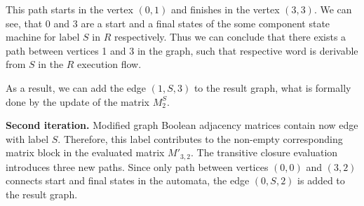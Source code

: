 This path starts in the vertex $(0,1)$ and finishes in the vertex $(3,3)$. 
We can see, that 0 and 3 are a start and a final states of the some component 
state machine for label $S$ in $R$ respectively. Thus we can conclude that 
there exists a path between vertices 1 and 3 in the graph, such that 
respective word is derivable from $S$ in the $R$ execution flow.

As a result, we can add the edge $(1,S,3)$ to the result graph, what is 
formally done by the update of the matrix $M_2^S$.

\textbf{Second iteration.} Modified graph Boolean adjacency matrices contain 
now edge with label $S$. Therefore, this label contributes to the non-empty 
corresponding matrix block in the evaluated matrix $M'_{3,{2}}$. The transitive closure
evaluation introduces three new paths. Since only path between vertices $(0,0)$ and
$(3,2)$ connects start and final states in the automata, the edge $(0,S,2)$ is added
to the result graph.

